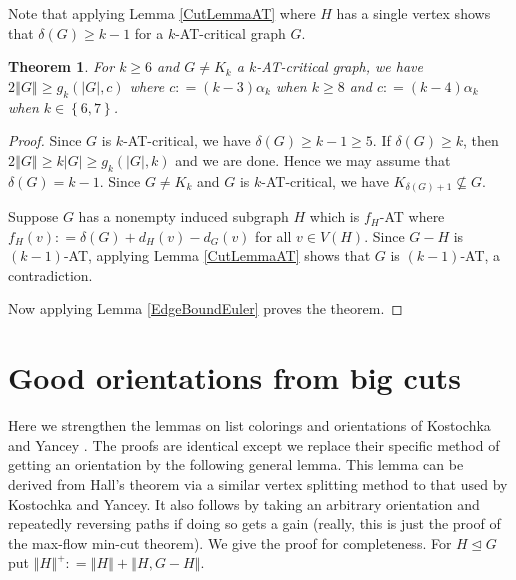 \documentclass[12pt]{article}
\theoremstyle{plain}
\newtheorem{thm}{Theorem}[section]
\theoremstyle{definition}
\theoremstyle{remark}
\newcommand{\set}[1]{\left\{ #1 \right\}}
\newcommand{\card}[1]{\left|#1\right|}
\newcommand{\size}[1]{\left\Vert#1\right\Vert}
\newcommand{\DefinedAs}{\mathrel{\mathop:}=}
\begin{document}
Note that applying Lemma \ref{CutLemmaAT} where $H$ has a single vertex shows that $\delta(G) \geq k - 1$ for a $k$-AT-critical graph $G$.

\begin{thm}\label{EdgeBoundAT}
For $k \geq 6$ and $G \neq K_k$ a $k$-AT-critical graph, we have $2\size{G} \geq g_k(\card{G}, c)$ where $c \DefinedAs (k-3)\alpha_k$ when $k \geq 8$ and $c \DefinedAs (k-4)\alpha_k$ when $k \in \set{6,7}$.
\end{thm}
\begin{proof}
Since $G$ is $k$-AT-critical, we have $\delta(G) \geq k - 1 \geq 5$.  If $\delta(G) \geq k$, then $2\size{G} \geq k\card{G} \geq g_k(\card{G}, k)$ and we are done.  Hence we may assume that $\delta(G) = k-1$. Since $G \neq K_k$ and $G$ is $k$-AT-critical, we have $K_{\delta(G) + 1} \not \subseteq G$.  

Suppose $G$ has a nonempty induced subgraph $H$ which is $f_H$-AT where $f_H(v) \DefinedAs \delta(G) + d_H(v) - d_G(v)$ for all $v \in V(H)$.  Since $G-H$ is $(k-1)$-AT, applying Lemma \ref{CutLemmaAT} shows that $G$ is $(k-1)$-AT, a contradiction.

Now applying Lemma \ref{EdgeBoundEuler} proves the theorem.
\end{proof}
\section{Good orientations from big cuts}\label{OrientationsSection}
Here we strengthen the lemmas on list colorings and orientations of Kostochka and Yancey \cite{kostochkayancey2012ore}.  The proofs are identical except we replace their specific method of getting an orientation by the following general lemma.  This lemma can be derived from Hall's theorem via a similar vertex splitting method to that used by Kostochka and Yancey. It also follows by taking an arbitrary orientation and repeatedly reversing paths if doing so gets a gain (really, this is just the proof of the max-flow min-cut theorem).  We give the proof for completeness.  For $H \unlhd G$ put $\size{H}^+ \DefinedAs \size{H} + \size{H, G-H}$.
\end{document}

